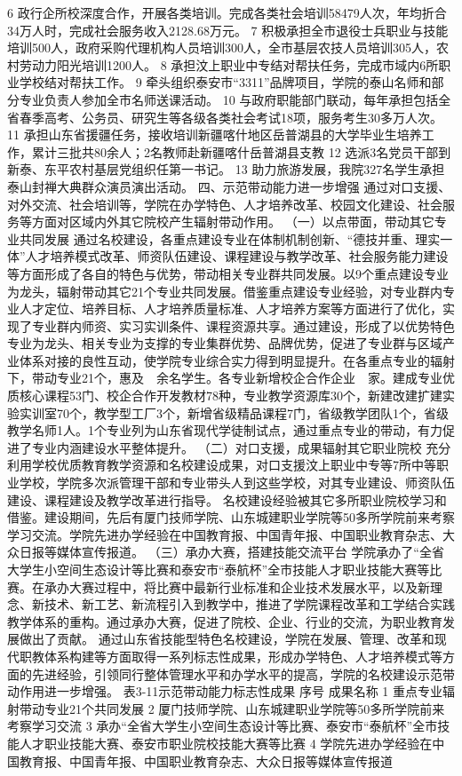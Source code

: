 6
政行企所校深度合作，开展各类培训。完成各类社会培训58479人次，年均折合34万人时，完成社会服务收入2128.68万元。
7
积极承担全市退役士兵职业与技能培训500人，政府采购代理机构人员培训300人，全市基层农技人员培训305人，农村劳动力阳光培训1200人。
8
承担汶上职业中专结对帮扶任务，完成市域内6所职业学校结对帮扶工作。
9
牵头组织泰安市“3311”品牌项目，学院的泰山名师和部分专业负责人参加全市名师送课活动。
10
与政府职能部门联动，每年承担包括全省春季高考、公务员、研究生等各级各类社会考试18项，服务考生30多万人次。
11
承担山东省援疆任务，接收培训新疆喀什地区岳普湖县的大学毕业生培养工作，累计三批共80余人；2名教师赴新疆喀什岳普湖县支教
12
选派3名党员干部到新泰、东平农村基层党组织任第一书记。
13
助力旅游发展，我院327名学生承担泰山封禅大典群众演员演出活动。
四、示范带动能力进一步增强
通过对口支援、对外交流、社会培训等，学院在办学特色、人才培养改革、校园文化建设、社会服务等方面对区域内外其它院校产生辐射带动作用。
（一）以点带面，带动其它专业共同发展
通过名校建设，各重点建设专业在体制机制创新、“德技并重、理实一体”人才培养模式改革、师资队伍建设、课程建设与教学改革、社会服务能力建设等方面形成了各自的特色与优势，带动相关专业群共同发展。以9个重点建设专业为龙头，辐射带动其它21个专业共同发展。借鉴重点建设专业经验，对专业群内专业人才定位、培养目标、人才培养质量标准、人才培养方案等方面进行了优化，实现了专业群内师资、实习实训条件、课程资源共享。通过建设，形成了以优势特色专业为龙头、相关专业为支撑的专业集群优势、品牌优势，促进了专业群与区域产业体系对接的良性互动，使学院专业综合实力得到明显提升。在各重点专业的辐射下，带动专业21个，惠及　余名学生。各专业新增校企合作企业　家。建成专业优质核心课程53门、校企合作开发教材78种，专业教学资源库30个，新建改建扩建实验实训室70个，教学型工厂3个，新增省级精品课程7门，省级教学团队1个，省级教学名师1人。1个专业列为山东省现代学徒制试点，通过重点专业的带动，有力促进了专业内涵建设水平整体提升。
（二）对口支援，成果辐射其它职业院校
充分利用学校优质教育教学资源和名校建设成果，对口支援汶上职业中专等7所中等职业学校，学院多次派管理干部和专业带头人到这些学校，对其专业建设、师资队伍建设、课程建设及教学改革进行指导。
名校建设经验被其它多所职业院校学习和借鉴。建设期间，先后有厦门技师学院、山东城建职业学院等50多所学院前来考察学习交流。学院先进办学经验在中国教育报、中国青年报、中国职业教育杂志、大众日报等媒体宣传报道。
（三）承办大赛，搭建技能交流平台
学院承办了“全省大学生小空间生态设计等比赛和泰安市“泰航杯”全市技能人才职业技能大赛等比赛。在承办大赛过程中，将比赛中最新行业标准和企业技术发展水平，以及新理念、新技术、新工艺、新流程引入到教学中，推进了学院课程改革和工学结合实践教学体系的重构。通过承办大赛，促进了院校、企业、行业的交流，为职业教育发展做出了贡献。
通过山东省技能型特色名校建设，学院在发展、管理、改革和现代职教体系构建等方面取得一系列标志性成果，形成办学特色、人才培养模式等方面的先进经验，引领同行整体管理水平和办学水平的提高，学院的名校建设示范带动作用进一步增强。
表3-11示范带动能力标志性成果
序号
成果名称
1
重点专业辐射带动专业21个共同发展
2
厦门技师学院、山东城建职业学院等50多所学院前来考察学习交流
3
承办“全省大学生小空间生态设计等比赛、泰安市“泰航杯”全市技能人才职业技能大赛、泰安市职业院校技能大赛等比赛
4
学院先进办学经验在中国教育报、中国青年报、中国职业教育杂志、大众日报等媒体宣传报道









